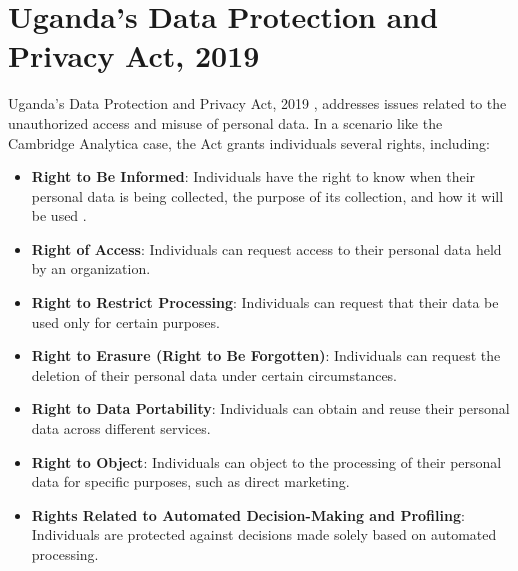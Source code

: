\documentclass[12pt]{article}
\begin{document}
\section{Uganda’s Data Protection and Privacy Act, 2019}
Uganda’s Data Protection and Privacy Act, 2019 \cite{nsobani2019critical}, addresses issues related to the unauthorized access and misuse of personal data. In a scenario like the Cambridge Analytica case, the Act grants individuals several rights, including:
\begin{itemize}
    \item \textbf{Right to Be Informed}: Individuals have the right to know when their personal data is being collected, the purpose of its collection, and how it will be used \cite{ugandadataact2019}.
    \item \textbf{Right of Access}: Individuals can request access to their personal data held by an organization.
    \item \textbf{Right to Restrict Processing}: Individuals can request that their data be used only for certain purposes.
    \item \textbf{Right to Erasure (Right to Be Forgotten)}: Individuals can request the deletion of their personal data under certain circumstances.
    \item \textbf{Right to Data Portability}: Individuals can obtain and reuse their personal data across different services.
    \item \textbf{Right to Object}: Individuals can object to the processing of their personal data for specific purposes, such as direct marketing.
    \item \textbf{Rights Related to Automated Decision-Making and Profiling}: Individuals are protected against decisions made solely based on automated processing.
\end{itemize}
\end{document}
